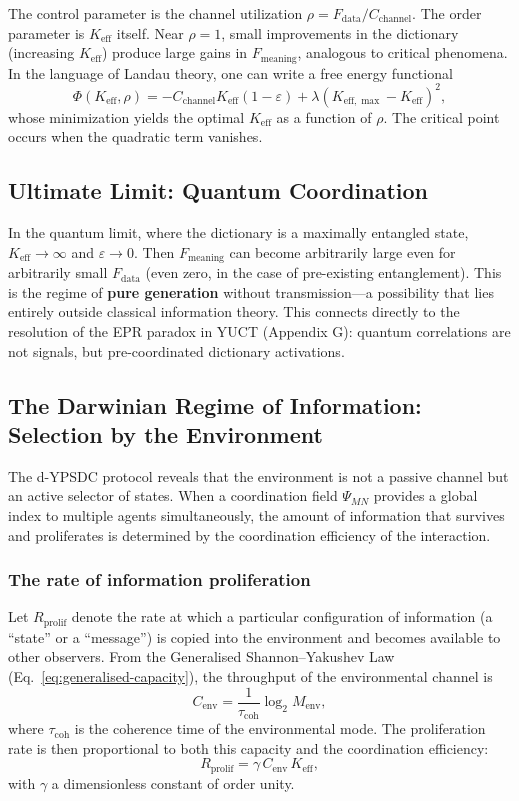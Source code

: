 \documentclass[12pt,a4paper]{article}
\theoremstyle{remark}
\newcommand{\Keff}{K_{\mathrm{eff}}}
\newcommand{\Keffmax}{K_{\mathrm{eff},\max}}
\begin{document}
	The control parameter is the channel utilization $\rho = F_{\text{data}} / C_{\text{channel}}$. The order parameter is $\Keff$ itself. Near $\rho = 1$, small improvements in the dictionary (increasing $\Keff$) produce large gains in $F_{\text{meaning}}$, analogous to critical phenomena. In the language of Landau theory, one can write a free energy functional
	\[
	\Phi(\Keff, \rho) = -C_{\text{channel}} \Keff (1 - \varepsilon) + \lambda (\Keffmax - \Keff)^2,
	\]
	whose minimization yields the optimal $\Keff$ as a function of $\rho$. The critical point occurs when the quadratic term vanishes.
	
	\subsection{Ultimate Limit: Quantum Coordination}
	
	In the quantum limit, where the dictionary is a maximally entangled state, $\Keff \to \infty$ and $\varepsilon \to 0$. Then $F_{\text{meaning}}$ can become arbitrarily large even for arbitrarily small $F_{\text{data}}$ (even zero, in the case of pre-existing entanglement). This is the regime of \textbf{pure generation} without transmission---a possibility that lies entirely outside classical information theory. This connects directly to the resolution of the EPR paradox in YUCT (Appendix G): quantum correlations are not signals, but pre-coordinated dictionary activations.
	
	\subsection{The Darwinian Regime of Information: Selection by the Environment}
	\label{subsec:darwinian-regime}
	
	The d-YPSDC protocol reveals that the environment is not a passive channel
	but an active selector of states. When a coordination field \(\Psi_{MN}\)
	provides a global index to multiple agents simultaneously, the amount of
	information that survives and proliferates is determined by the
	coordination efficiency of the interaction.
	
	\subsubsection*{The rate of information proliferation}
	Let \(R_{\mathrm{prolif}}\) denote the rate at which a particular
	configuration of information (a ``state'' or a ``message'') is copied
	into the environment and becomes available to other observers. From the
	Generalised Shannon--Yakushev Law (Eq.~\ref{eq:generalised-capacity}), the
	throughput of the environmental channel is
	\[
	C_{\mathrm{env}} = \frac{1}{\tau_{\mathrm{coh}}} \log_2 M_{\mathrm{env}},
	\]
	where \(\tau_{\mathrm{coh}}\) is the coherence time of the environmental
	mode. The proliferation rate is then proportional to both this capacity
	and the coordination efficiency:
	\begin{equation}
		R_{\mathrm{prolif}} = \gamma \, C_{\mathrm{env}} \, K_{\mathrm{eff}},
		\label{eq:Rprolif}
	\end{equation}
	with \(\gamma\) a dimensionless constant of order unity.
	
\end{document}
